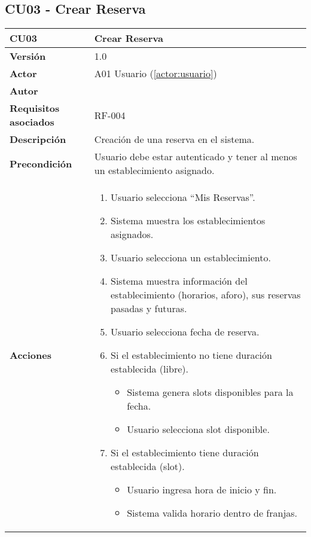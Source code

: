 \subsection{CU03 - Crear Reserva}

\begin{table}[H]
	\centering
	\begin{tabularx}{\linewidth}{ p{} p{} }
		\toprule
		\textbf{CU03}    & \textbf{Crear Reserva} \\
		\toprule
		\textbf{Versión}              & 1.0    \\
		\textbf{Actor}                & A01 Usuario (\ref{actor:usuario}) \\
		\textbf{Autor}                & \nombre \\
		\textbf{Requisitos asociados} & RF-004 \\
		\textbf{Descripción}          & Creación de una reserva en el sistema. \\
		\textbf{Precondición}         & Usuario debe estar autenticado y tener al menos un establecimiento asignado. \\
		\textbf{Acciones}             &
		\begin{enumerate}
			\def\labelenumi{\arabic{enumi}.}
			\tightlist
			\item Usuario selecciona ``Mis Reservas''.
            \item Sistema muestra los establecimientos asignados.
            \item Usuario selecciona un establecimiento.
            \item Sistema muestra información del establecimiento (horarios, aforo), sus reservas pasadas y futuras.
            \item Usuario selecciona fecha de reserva.
            \item Si el establecimiento no tiene duración establecida (libre).
   		\begin{itemize}
  			\item Sistema genera slots disponibles para la fecha.
			  \item Usuario selecciona slot disponible.
  		\end{itemize}
            \item Si el establecimiento tiene duración establecida (slot).
   		\begin{itemize}
  			\item Usuario ingresa hora de inicio y fin.
			  \item Sistema valida horario dentro de franjas.

\end{itemize}
\end{enumerate}
\end{tabularx}
\end{table}
